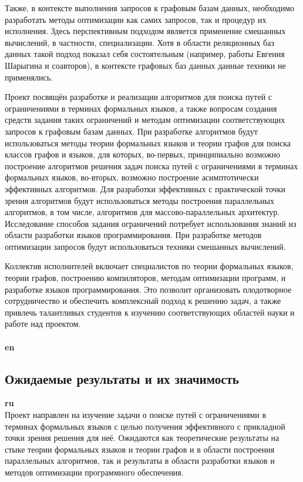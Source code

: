\documentclass[12pt]{article}  %
\theoremstyle{remark}
\begin{document}
Также, в контексте выполнения запросов к графовым базам данных, необходимо разработать методы оптимизации как самих запросов, так и процедур их исполнения. Здесь перспективным подходом является применение смешанных вычислений, в частности, специализации. Хотя в области реляционных баз данных такой подход показал себя состоятельным (например, работы Евгения Шарыгина и соавторов), в контексте графовых баз данных данные техники не применялись.

Проект посвящён разработке и реализации алгоритмов для поиска путей с ограничениями в терминах формальных языков, а также вопросам создания средств задания таких ограничений и методам оптимизации соответствующих запросов к графовым базам данных. При разработке алгоритмов будут использоваться методы теории формальных языков и теории графов для поиска классов графов и языков, для которых, во-первых, принципиально возможно построение алгоритмов решения задач поиска путей с ограничениями в терминах формальных языков, во-вторых,  возможно построение асимптотически эффективных алгоритмов. Для разработки эффективных с практической точки зрения алгоритмов будут использоваться методы построения параллельных алгоритмов, в том числе, алгоритмов для массово-параллельных архитектур. Исследование способов задания ограничений потребует использования знаний из области разработки языков программирования. При разработке методов оптимизации запросов будут использоваться техники смешанных вычислений.

Коллектив исполнителей включает специалистов по теории формальных языков, теории графов, построению компиляторов, методам оптимизации программ, и разработке языков программирования. Это позволит организовать плодотворное сотрудничество и обеспечить комплексный подход к решению задач, а также привлечь талантливых студентов к изучению соответствующих областей науки и работе над проектом.
\\
\\
\textbf{en}\\

\subsection{Ожидаемые результаты и их значимость}

\textbf{ru}\\
%
Проект направлен на изучение задачи о поиске путей с ограничениями в терминах формальных языков с целью получения эффективного с прикладной точки зрения решения для неё. Ожидаются как теоретические результаты на стыке теории формальных языков и теории графов и в области построения параллельных алгоритмов, так и результаты в области разработки языков и методов оптимизации программного обеспечения.
\end{document}
